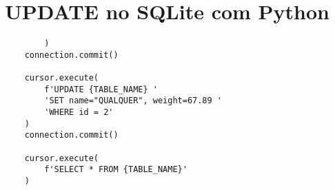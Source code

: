 \documentclass{article}
\begin{document}
    \section{UPDATE no SQLite com Python}
    \begin{lstlisting}
        )
    connection.commit()

    cursor.execute(
        f'UPDATE {TABLE_NAME} '
        'SET name="QUALQUER", weight=67.89 '
        'WHERE id = 2'
    )
    connection.commit()

    cursor.execute(
        f'SELECT * FROM {TABLE_NAME}'
    )

    \end{lstlisting}



    
\end{document}
